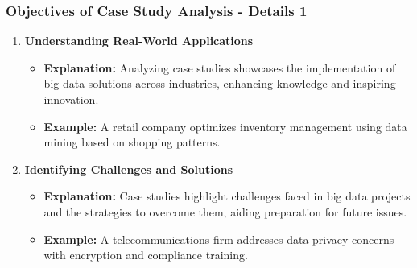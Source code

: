 \documentclass[aspectratio=169]{beamer}
\begin{document}
\begin{frame}[fragile]
    \frametitle{Objectives of Case Study Analysis - Details 1}
    \begin{enumerate}
        \item \textbf{Understanding Real-World Applications}  
            \begin{itemize}
                \item \textbf{Explanation:} Analyzing case studies showcases the implementation of big data solutions across industries, enhancing knowledge and inspiring innovation.
                \item \textbf{Example:} A retail company optimizes inventory management using data mining based on shopping patterns.
            \end{itemize}

        \item \textbf{Identifying Challenges and Solutions}  
            \begin{itemize}
                \item \textbf{Explanation:} Case studies highlight challenges faced in big data projects and the strategies to overcome them, aiding preparation for future issues.
                \item \textbf{Example:} A telecommunications firm addresses data privacy concerns with encryption and compliance training.
            \end{itemize}
    \end{enumerate}
\end{frame}
\end{document}
